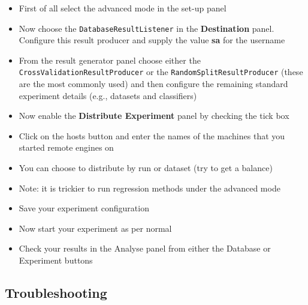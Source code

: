 \documentclass[a4paper]{article}
\begin{document}
\begin{itemize}
   \item First of all select the advanced mode in the set-up panel
   \item Now choose the \texttt{DatabaseResultListener} in the \textbf{Destination} panel. Configure this result producer and supply the value \textbf{sa} for the username
   \item From the result generator panel choose either the \texttt{CrossValidationResultProducer} or the \texttt{RandomSplitResultProducer} (these are the most commonly used) and then configure the remaining standard experiment details (e.g., datasets and classifiers)
   \item Now enable the \textbf{Distribute Experiment} panel by checking the tick box
   \item Click on the hosts button and enter the names of the machines that you started remote engines on
   \item You can choose to distribute by run or dataset (try to get a balance)
   \item Note: it is trickier to run regression methods under the advanced mode
   \item Save your experiment configuration
   \item Now start your experiment as per normal
   \item Check your results in the Analyse panel from either the Database or Experiment buttons 
\end{itemize}


\subsection{Troubleshooting}
\end{document}
